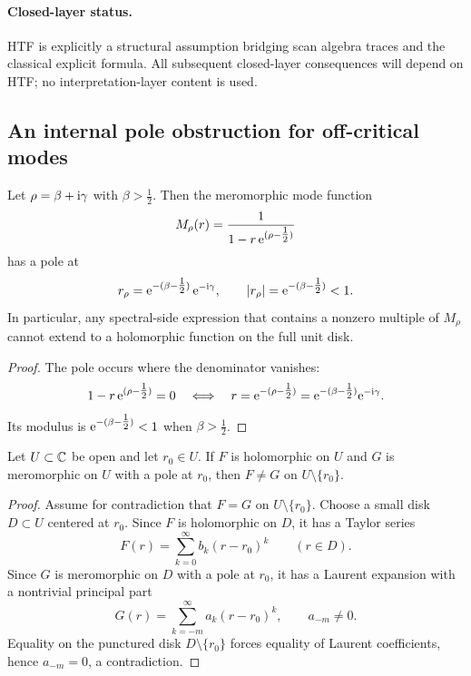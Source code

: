 \paragraph{Closed-layer status.}
HTF is explicitly a structural assumption bridging scan algebra traces and the classical explicit formula.
All subsequent closed-layer consequences will depend on HTF; no interpretation-layer content is used.

\subsection{An internal pole obstruction for off-critical modes}
\label{sec:abel_obstruction}

\begin{lemma}
\label{lem:abel_obstruction}
Let $\rho=\beta+\mathrm{i}\gamma$ with $\beta>\tfrac{1}{2}$.
Then the meromorphic mode function
\[
M_\rho(r)=\frac{1}{1-r\,\mathrm{e}^{(\rho-\tfrac{1}{2})}}
\]
has a pole at
\[
r_\rho=\mathrm{e}^{-(\beta-\tfrac{1}{2})}\,\mathrm{e}^{-\mathrm{i}\gamma},
\qquad |r_\rho|=\mathrm{e}^{-(\beta-\tfrac{1}{2})}<1.
\]
In particular, any spectral-side expression that contains a nonzero multiple of $M_\rho$ cannot extend to a holomorphic function on the full unit disk.
\end{lemma}

\begin{proof}
The pole occurs where the denominator vanishes:
\[
1-r\,\mathrm{e}^{(\rho-\tfrac{1}{2})}=0
\quad\Longleftrightarrow\quad
r=\mathrm{e}^{-(\rho-\tfrac{1}{2})}=\mathrm{e}^{-(\beta-\tfrac{1}{2})}\mathrm{e}^{-\mathrm{i}\gamma}.
\]
Its modulus is $\mathrm{e}^{-(\beta-\tfrac{1}{2})}<1$ when $\beta>\tfrac{1}{2}$.
\end{proof}

\begin{lemma}
\label{lem:holomorphic_meromorphic_pole}
Let $U\subset\mathbb{C}$ be open and let $r_0\in U$.
If $F$ is holomorphic on $U$ and $G$ is meromorphic on $U$ with a pole at $r_0$, then $F\neq G$ on $U\setminus\{r_0\}$.
\end{lemma}

\begin{proof}
Assume for contradiction that $F=G$ on $U\setminus\{r_0\}$.
Choose a small disk $D\subset U$ centered at $r_0$.
Since $F$ is holomorphic on $D$, it has a Taylor series
\[
F(r)=\sum_{k=0}^{\infty} b_k (r-r_0)^k
\qquad (r\in D).
\]
Since $G$ is meromorphic on $D$ with a pole at $r_0$, it has a Laurent expansion with a nontrivial principal part
\[
G(r)=\sum_{k=-m}^{\infty} a_k (r-r_0)^k,
\qquad a_{-m}\neq 0.
\]
Equality on the punctured disk $D\setminus\{r_0\}$ forces equality of Laurent coefficients, hence $a_{-m}=0$, a contradiction.
\end{proof}

